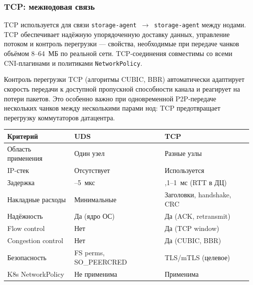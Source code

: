 \subsubsection{TCP: межнодовая связь}

TCP используется для связи \texttt{storage-agent $\to$ storage-agent} между нодами. TCP обеспечивает надёжную упорядоченную доставку данных, управление потоком и контроль перегрузки --- свойства, необходимые при передаче чанков объёмом 8--64~МБ по реальной сети. TCP-соединения совместимы со всеми CNI-плагинами и политиками \texttt{NetworkPolicy}.

Контроль перегрузки TCP (алгоритмы CUBIC, BBR) автоматически адаптирует скорость передачи к доступной пропускной способности канала и реагирует на потери пакетов. Это особенно важно при одновременной P2P-передаче нескольких чанков между несколькими парами нод: TCP предотвращает перегрузку коммутаторов датацентра.

\begin{table}[htbp]
\centering
\tablebodyfont
\begin{tabularx}{\textwidth}{|>{\raggedright\arraybackslash}p{45mm}|>{\centering\arraybackslash}p{35mm}|>{\centering\arraybackslash}X|}
\hline
\textbf{Критерий} & \textbf{UDS} & \textbf{TCP} \\ \hline
Область применения     & Один узел                & Разные узлы \\ \hline
IP-стек                & Отсутствует              & Используется \\ \hline
Задержка               & 1--5~мкс                 & 0,1--1~мс (RTT в ДЦ) \\ \hline
Накладные расходы      & Минимальные              & Заголовки, handshake, CRC \\ \hline
Надёжность             & Да (ядро ОС)             & Да (ACK, retransmit) \\ \hline
Flow control           & Нет                      & Да (TCP window) \\ \hline
Congestion control     & Нет                      & Да (CUBIC, BBR) \\ \hline
Безопасность           & FS perms, SO\_PEERCRED   & TLS/mTLS (целевое) \\ \hline
K8s NetworkPolicy      & Не применима             & Применима \\
\hline
\end{tabularx}
\end{table}

